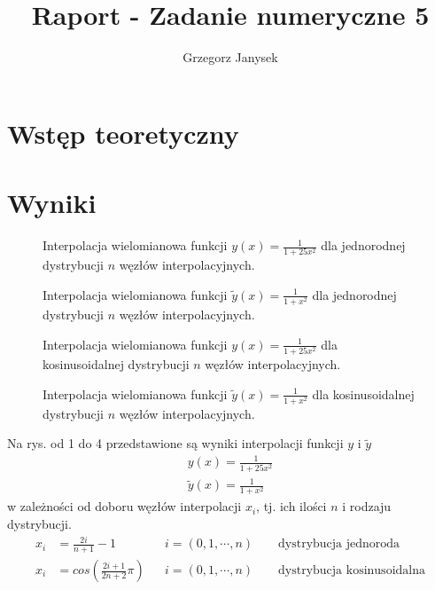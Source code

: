 \documentclass[11pt]{extarticle}
\author{Grzegorz Janysek}
\title{Raport - Zadanie numeryczne 5}
\begin{document}
	\maketitle

	\section{Wstęp teoretyczny}

	\pagebreak
	\section{Wyniki}
	\begin{figure}[H]
		\begin{center}
			
		\end{center}
		\caption{Interpolacja wielomianowa funkcji \( y(x)=\frac{1}{1+25x^2} \) dla jednorodnej dystrybucji \(n\) węzłów interpolacyjnych.}
		\label{f1u}
	\end{figure}
	\begin{figure}[H]
		\begin{center}
			
		\end{center}
		\caption{Interpolacja wielomianowa funkcji \( \widetilde{y}(x)=\frac{1}{1+x^2} \) dla jednorodnej dystrybucji \(n\) węzłów interpolacyjnych.}
		\label{f2u}
	\end{figure}
	\begin{figure}[H]
		\begin{center}
			
		\end{center}
		\caption{Interpolacja wielomianowa funkcji \( y(x)=\frac{1}{1+25x^2} \) dla kosinusoidalnej dystrybucji \(n\) węzłów interpolacyjnych.}
		\label{f1c}
	\end{figure}
	\begin{figure}[H]
		\begin{center}
			
		\end{center}
		\caption{Interpolacja wielomianowa funkcji \( \widetilde{y}(x)=\frac{1}{1+x^2} \) dla kosinusoidalnej dystrybucji \(n\) węzłów interpolacyjnych.}
		\label{f2c}
	\end{figure}
	\pagebreak

	Na rys. od 1 do 4 przedstawione są wyniki interpolacji funkcji \(y\) i \(\widetilde{y}\)
	\begin{align}
		y(x) = \frac{1}{1+25x^2} \\
		\widetilde{y}(x) = \frac{1}{1+x^2}
	\end{align}
	w zależności od doboru węzłów interpolacji \(x_i\), tj. ich ilości \(n\) i rodzaju dystrybucji.
	\begin{align}
		x_i &= \frac{2i}{n+1}-1 &&i=(0, 1, \dotsm, n)
		\qquad \text{dystrybucja jednoroda} \\
		x_i &= cos\left(\frac{2i+1}{2n+2}\pi\right) &&i=(0, 1, \dotsm, n) 
		\qquad \text{dystrybucja kosinusoidalna}
	\end{align}
\end{document}
